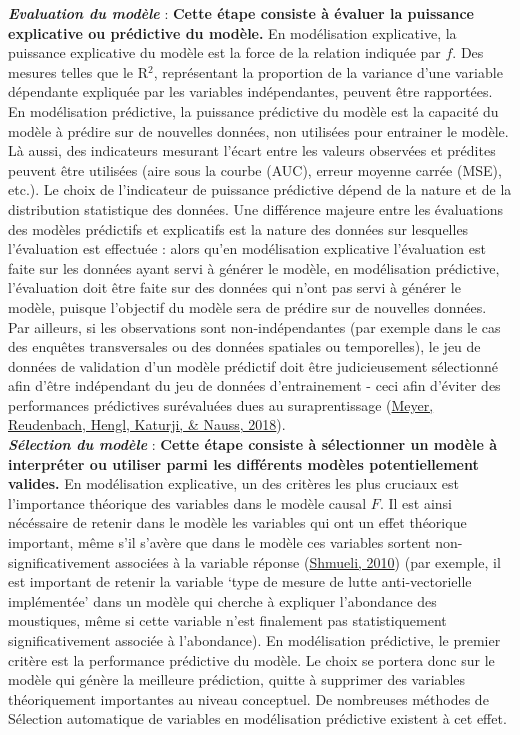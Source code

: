 \documentclass[12pt,twoside]{reedthesis}
\begin{document}
\textbf{\emph{Evaluation du modèle}} : \textbf{Cette étape consiste à évaluer la puissance explicative ou prédictive du modèle.} En modélisation explicative, la puissance explicative du modèle est la force de la relation indiquée par \(f\). Des mesures telles que le R\(^{2}\), représentant la proportion de la variance d'une variable dépendante expliquée par les variables indépendantes, peuvent être rapportées. En modélisation prédictive, la puissance prédictive du modèle est la capacité du modèle à prédire sur de nouvelles données, non utilisées pour entrainer le modèle. Là aussi, des indicateurs mesurant l'écart entre les valeurs observées et prédites peuvent être utilisées (aire sous la courbe (AUC), erreur moyenne carrée (MSE), etc.). Le choix de l'indicateur de puissance prédictive dépend de la nature et de la distribution statistique des données. Une différence majeure entre les évaluations des modèles prédictifs et explicatifs est la nature des données sur lesquelles l'évaluation est effectuée : alors qu'en modélisation explicative l'évaluation est faite sur les données ayant servi à générer le modèle, en modélisation prédictive, l'évaluation doit être faite sur des données qui n'ont pas servi à générer le modèle, puisque l'objectif du modèle sera de prédire sur de nouvelles données. Par ailleurs, si les observations sont non-indépendantes (par exemple dans le cas des enquêtes transversales ou des données spatiales ou temporelles), le jeu de données de validation d'un modèle prédictif doit être judicieusement sélectionné afin d'être indépendant du jeu de données d'entrainement - ceci afin d'éviter des performances prédictives surévaluées dues au suraprentissage (\protect\hyperlink{ref-meyer_improving_2018}{Meyer, Reudenbach, Hengl, Katurji, \& Nauss, 2018}).\\

\textbf{\emph{Sélection du modèle}} : \textbf{Cette étape consiste à sélectionner un modèle à interpréter ou utiliser parmi les différents modèles potentiellement valides.} En modélisation explicative, un des critères les plus cruciaux est l'importance théorique des variables dans le modèle causal \(F\). Il est ainsi nécéssaire de retenir dans le modèle les variables qui ont un effet théorique important, même s'il s'avère que dans le modèle ces variables sortent non-significativement associées à la variable réponse (\protect\hyperlink{ref-shmueli_explain_2010}{Shmueli, 2010}) (par exemple, il est important de retenir la variable `type de mesure de lutte anti-vectorielle implémentée' dans un modèle qui cherche à expliquer l'abondance des moustiques, même si cette variable n'est finalement pas statistiquement significativement associée à l'abondance). En modélisation prédictive, le premier critère est la performance prédictive du modèle. Le choix se portera donc sur le modèle qui génère la meilleure prédiction, quitte à supprimer des variables théoriquement importantes au niveau conceptuel. De nombreuses méthodes de Sélection automatique de variables en modélisation prédictive existent à cet effet.\\
\end{document}
